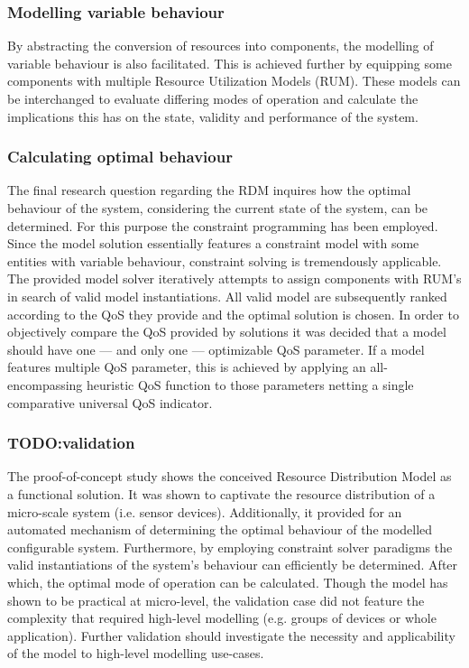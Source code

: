 \subsubsection{Modelling variable behaviour}
By abstracting the conversion of resources into components, the modelling of variable behaviour is also facilitated. This is achieved further by equipping some components with multiple Resource Utilization Models (RUM). These models can be interchanged to evaluate differing modes of operation and calculate the implications this has on the state, validity and performance of the system.

\subsubsection{Calculating optimal behaviour}
The final research question regarding the RDM inquires how the optimal behaviour of the system, considering the current state of the system, can be determined. For this purpose the constraint programming has been employed. Since the model solution essentially features a constraint model with some entities with variable behaviour, constraint solving is tremendously applicable. The provided model solver iteratively attempts to assign components with RUM's in search of valid model instantiations. All valid model are subsequently ranked according to the QoS they provide and the optimal solution is chosen. In order to objectively compare the QoS provided by solutions it was decided that a model should have one --- and only one --- optimizable QoS parameter. If a model features multiple QoS parameter, this is achieved by applying an all-encompassing heuristic QoS function to those parameters netting a single comparative universal QoS indicator.

\subsubsection{TODO:validation}
The proof-of-concept study shows the conceived Resource Distribution Model as a functional solution. It was shown to captivate the resource distribution of a micro-scale system (i.e. sensor devices). Additionally, it provided for an automated mechanism of determining the optimal behaviour of the modelled configurable system. Furthermore, by employing constraint solver paradigms the valid instantiations of the system's behaviour can efficiently be determined. After which, the optimal mode of operation can be calculated. Though the model has shown to be practical at micro-level, the validation case did not feature the complexity that required high-level modelling (e.g. groups of devices or whole application). Further validation should investigate the necessity and applicability of the model to high-level modelling use-cases.

